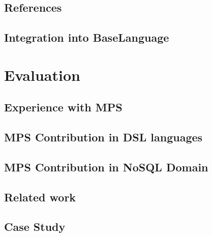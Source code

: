 \section{References}

\section{Integration into BaseLanguage}

\chapter{Evaluation}

\section{Experience with MPS}

\section{MPS Contribution in DSL languages}


\section{MPS Contribution in NoSQL Domain}

\section{Related work}
		
\section{Case Study}








